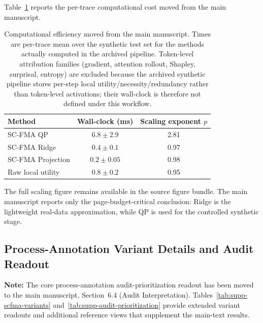 \documentclass[a4paper,fleqn]{cas-sc}
\begin{document}
Table~\ref{tab:supp-efficiency} reports the per-trace computational cost moved from the main manuscript.

\begin{table}[ht]
\caption{Computational efficiency moved from the main manuscript. Times are per-trace mean over the synthetic test set for the methods actually computed in the archived pipeline. Token-level attribution families (gradient, attention rollout, Shapley, surprisal, entropy) are excluded because the archived synthetic pipeline stores per-step local utility/necessity/redundancy rather than token-level activations; their wall-clock is therefore not defined under this workflow.}
\label{tab:supp-efficiency}
\centering
\small
\begin{tabular}{lcc}
\toprule
\textbf{Method} & \textbf{Wall-clock (ms)} & \textbf{Scaling exponent $p$} \\
\midrule
SC-FMA QP & $6.8 \pm 2.9$ & 2.81 \\
SC-FMA Ridge & $0.4 \pm 0.1$ & 0.97 \\
SC-FMA Projection & $0.2 \pm 0.05$ & 0.98 \\
Raw local utility & $0.8 \pm 0.2$ & 0.95 \\
\bottomrule
\end{tabular}
\end{table}

The full scaling figure remains available in the source figure bundle. The main manuscript reports only the page-budget-critical conclusion: Ridge is the lightweight real-data approximation, while QP is used for the controlled synthetic stage.

\subsection{Process-Annotation Variant Details and Audit Readout}
\label{app:prm800k-variant-details}

\noindent\textbf{Note:} The core process-annotation audit-prioritization readout has been moved to the main manuscript, Section~6.4 (Audit Interpretation). Tables~\ref{tab:supp-scfma-variants} and~\ref{tab:supp-audit-prioritization} provide extended variant readouts and additional reference views that supplement the main-text results.
\end{document}
